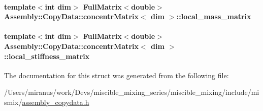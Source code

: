 \paragraph[{local\+\_\+mass\+\_\+matrix}]{\setlength{\rightskip}{0pt plus 5cm}template$<$int dim$>$ Full\+Matrix$<$double$>$ {\bf Assembly\+::\+Copy\+Data\+::concentr\+Matrix}$<$ dim $>$\+::local\+\_\+mass\+\_\+matrix}\label{struct_assembly_1_1_copy_data_1_1concentr_matrix_ac9d3fa147044cb330edcbfb28c9a51d8}
\hypertarget{struct_assembly_1_1_copy_data_1_1concentr_matrix_ae611593ae75fc8317c368c54443a63f8}{}
\paragraph[{local\+\_\+stiffness\+\_\+matrix}]{\setlength{\rightskip}{0pt plus 5cm}template$<$int dim$>$ Full\+Matrix$<$double$>$ {\bf Assembly\+::\+Copy\+Data\+::concentr\+Matrix}$<$ dim $>$\+::local\+\_\+stiffness\+\_\+matrix}\label{struct_assembly_1_1_copy_data_1_1concentr_matrix_ae611593ae75fc8317c368c54443a63f8}


The documentation for this struct was generated from the following file\+:\begin{DoxyCompactItemize}
\item 
/\+Users/miranus/work/\+Devs/miscible\+\_\+mixing\+\_\+series/miscible\+\_\+mixing/include/mismix/\hyperlink{assembly__copydata_8h}{assembly\+\_\+copydata.\+h}\end{DoxyCompactItemize}
